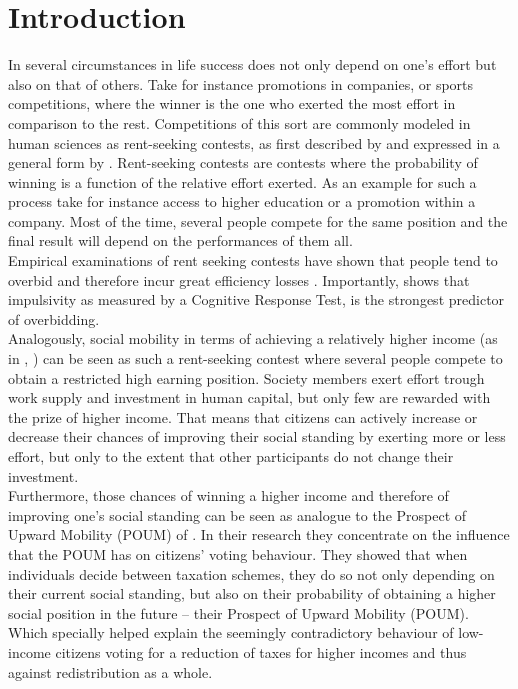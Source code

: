 \chapter{Introduction}
\thispagestyle{fancy}
\label{ch:intro}

In several circumstances in life success does not only depend on one's effort but also on that of others. Take for instance promotions in companies, or sports competitions, where the winner is the one who exerted the most effort in comparison to the rest. Competitions of this sort are commonly modeled in human sciences as rent-seeking contests, as first described by \cite{tullock1980}  and expressed in a general form by \cite{sheremeta2010a}. Rent-seeking contests are contests where the probability of winning is a function of the relative effort exerted. As an example for such a process take for instance access to higher education or a promotion within a company. Most of the time, several people compete for the same position and the final result will depend on the performances of them all.\\

Empirical examinations of rent seeking contests have shown that people tend to overbid and therefore incur great efficiency losses \citep{sheremeta2016, chowdhury2014, konrad2009, dechenaux2015}. Importantly, \cite{sheremeta2016} shows that impulsivity as measured by a Cognitive Response Test, is the strongest predictor of overbidding.\\

Analogously, social mobility in terms of achieving a relatively higher income (as in \cite{fields1996}, \cite{fields1999}) can be seen as such a rent-seeking contest where several people compete to obtain a restricted high earning position. Society members exert effort trough work supply and investment in human capital, but only few are rewarded with the prize of higher income. That means that citizens can actively increase or decrease their chances of improving their social standing by exerting more or less effort, but only to the extent that other participants do not change their investment.\\

Furthermore, those chances of winning a higher income and therefore of improving one's social standing can be seen as analogue to the Prospect of Upward Mobility (POUM) of \cite{benabou2001}. In their research they concentrate on the influence that the POUM has on citizens' voting behaviour. They showed that when individuals decide between taxation schemes, they do so not only depending on their current social standing, but also on their probability of obtaining a higher social position in the future -- their Prospect of Upward Mobility (POUM). Which specially helped explain the seemingly contradictory behaviour of low-income citizens voting for a reduction of taxes for higher incomes and thus against redistribution as a whole.\\

